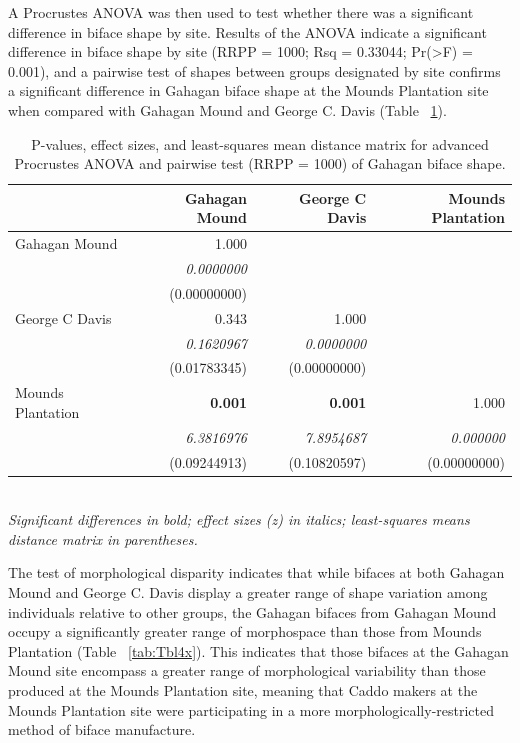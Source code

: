 \documentclass[review]{elsarticle}
\begin{document}
A Procrustes ANOVA was then used to test whether there was a significant difference in biface shape by site. Results of the ANOVA indicate a significant difference in biface shape by site (RRPP = 1000; Rsq = 0.33044; Pr(>F) = 0.001), and a pairwise test of shapes between groups designated by site confirms a significant difference in Gahagan biface shape at the Mounds Plantation site when compared with Gahagan Mound and George C. Davis (Table ~\ref{tab:Tbl3x}).

\begin{table}[tbh]\centering
\footnotesize
\caption{P-values, effect sizes, and least-squares mean distance matrix for advanced Procrustes ANOVA and pairwise test (RRPP = 1000) of Gahagan biface shape.}
\centering
\begin{tabular}{lrrr}
\toprule
 & Gahagan Mound & George C Davis & Mounds Plantation\\
\midrule
Gahagan Mound & 1.000 &  & \\
 & \textit{0.0000000} &  & \\
 & (0.00000000) &  & \\
George C Davis & 0.343 & 1.000 & \\
 & \textit{0.1620967} & \textit{0.0000000} & \\
 & (0.01783345) & (0.00000000) & \\
Mounds Plantation & \textbf{0.001} & \textbf{0.001} & 1.000\\
 & \textit{6.3816976} & \textit{7.8954687} & \textit{0.000000}\\
 & (0.09244913) & (0.10820597) & (0.00000000)\\
\bottomrule
\end{tabular}
\bigskip\\
\textit{Significant differences in bold; effect sizes (z) in italics; least-squares means distance matrix in parentheses.}
\label{tab:Tbl3x}
\end{table}

The test of morphological disparity indicates that while bifaces at both Gahagan Mound and George C. Davis display a greater range of shape variation among individuals relative to other groups, the Gahagan bifaces from Gahagan Mound occupy a significantly greater range of morphospace than those from Mounds Plantation (Table ~\ref{tab:Tbl4x}). This indicates that those bifaces at the Gahagan Mound site encompass a greater range of morphological variability than those produced at the Mounds Plantation site, meaning that Caddo makers at the Mounds Plantation site were participating in a more morphologically-restricted method of biface manufacture.
\end{document}
